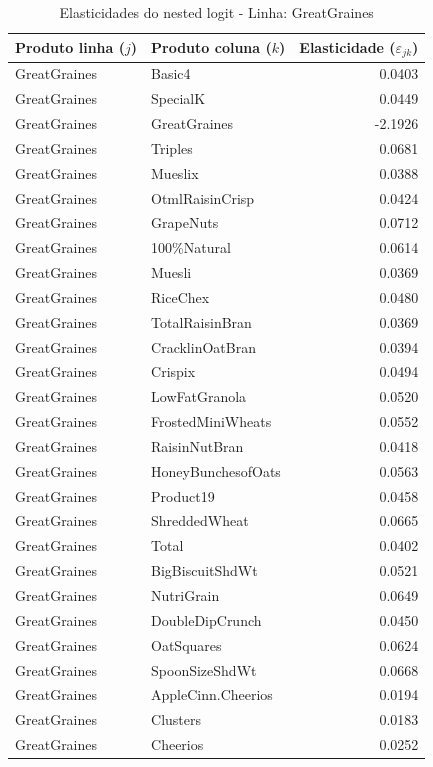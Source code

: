 \begingroup
\begin{table}[H]
\centering
\caption{Elasticidades do nested logit - Linha: GreatGraines}
\label{tab:elas-nested-greatgraines}
\small
\begin{tabular}{llr}
\toprule
Produto linha ($j$) & Produto coluna ($k$) & Elasticidade ($\varepsilon_{jk}$) \\
\midrule
GreatGraines & Basic4 & 0.0403 \\
GreatGraines & SpecialK & 0.0449 \\
GreatGraines & GreatGraines & -2.1926 \\
GreatGraines & Triples & 0.0681 \\
GreatGraines & Mueslix & 0.0388 \\
GreatGraines & OtmlRaisinCrisp & 0.0424 \\
GreatGraines & GrapeNuts & 0.0712 \\
GreatGraines & 100\%Natural & 0.0614 \\
GreatGraines & Muesli & 0.0369 \\
GreatGraines & RiceChex & 0.0480 \\
GreatGraines & TotalRaisinBran & 0.0369 \\
GreatGraines & CracklinOatBran & 0.0394 \\
GreatGraines & Crispix & 0.0494 \\
GreatGraines & LowFatGranola & 0.0520 \\
GreatGraines & FrostedMiniWheats & 0.0552 \\
GreatGraines & RaisinNutBran & 0.0418 \\
GreatGraines & HoneyBunchesofOats & 0.0563 \\
GreatGraines & Product19 & 0.0458 \\
GreatGraines & ShreddedWheat & 0.0665 \\
GreatGraines & Total & 0.0402 \\
GreatGraines & BigBiscuitShdWt & 0.0521 \\
GreatGraines & NutriGrain & 0.0649 \\
GreatGraines & DoubleDipCrunch & 0.0450 \\
GreatGraines & OatSquares & 0.0624 \\
GreatGraines & SpoonSizeShdWt & 0.0668 \\
GreatGraines & AppleCinn.Cheerios & 0.0194 \\
GreatGraines & Clusters & 0.0183 \\
GreatGraines & Cheerios & 0.0252 \\

\end{tabular}
\end{table}
